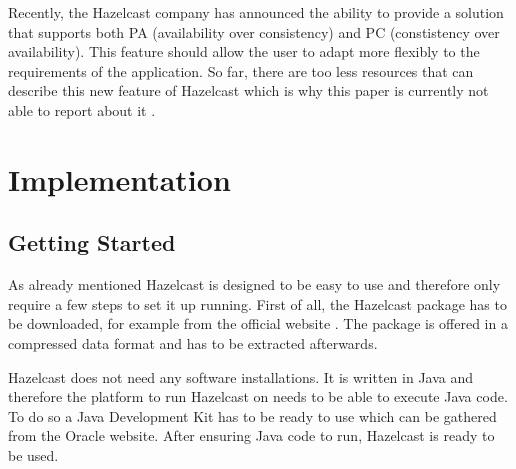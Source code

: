Recently, the Hazelcast company has announced the ability to provide a solution that supports both PA (availability over consistency) and PC (constistency over availability). This feature should allow the user to adapt more flexibly to the requirements of the application. So far, there are too less resources that can describe this new feature of Hazelcast which is why this paper is currently not able to report about it \parencite{hazelcastCAP}.

\section{Implementation}
\subsection*{Getting Started}
As already mentioned Hazelcast is designed to be easy to use and therefore only require a few steps to set it up running.
First of all, the Hazelcast package has to be downloaded, for example from the official website \parencite{hazelcast:hazelcastDownload}. The package is offered in a compressed data format and has to be extracted afterwards.

Hazelcast does not need any software installations. It is written in Java and therefore the platform to run Hazelcast on needs to be able to execute Java code. To do so a Java Development Kit has to be ready to use which can be gathered from the Oracle website. After ensuring Java code to run, Hazelcast is ready to be used.

